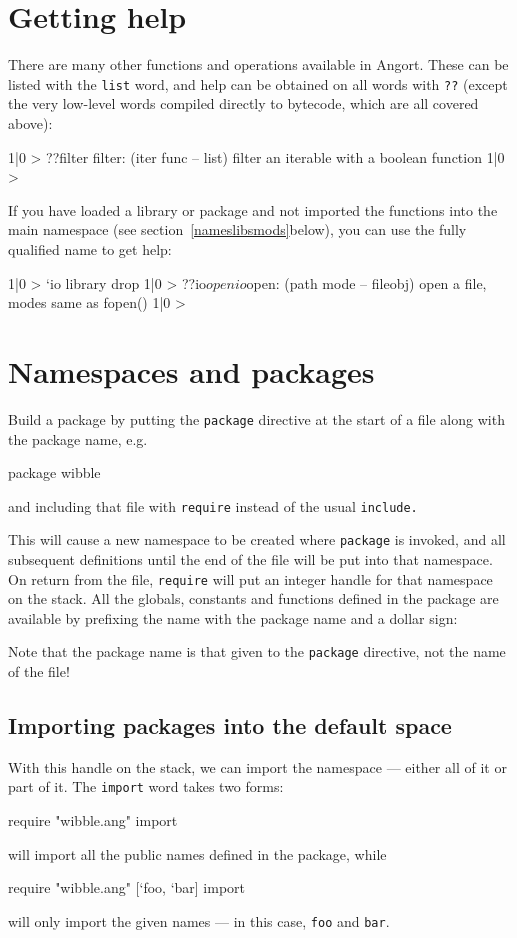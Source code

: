 \section{Getting help}
There are many other functions and operations available in Angort.
These can be listed with the \texttt{list} word, and help can
be obtained on all words with \texttt{??} (except the very low-level words compiled
directly to bytecode, which are all covered above):
\begin{v}
1|0 > ??filter
filter: (iter func -- list) filter an iterable with a boolean function
1|0 > 
\end{v}
If you have loaded a library or package and not imported the functions
into the main namespace (see section~\ref{nameslibsmods}below), you
can use the fully qualified name to get help:
\begin{v}
1|0 > `io library drop
1|0 > ??io$open
io$open: (path mode -- fileobj) open a file, modes same as fopen()
1|0 > 
\end{v}


\section{Namespaces and packages}
\label{packages}
\def\dollarsign{\$}\indw{\dollarsign}
Build a package by putting the \texttt{package} directive at the start
of a file along with the package name, e.g.
\begin{v}
package wibble
\end{v}
and including that file with \texttt{require} instead of the usual \texttt{include.} 

This will cause a new namespace to be created where \texttt{package} is 
invoked, and all subsequent definitions until the end of the file will
be put into that namespace. On return from the file, \texttt{require} will
put an integer handle for that namespace on the stack. All the globals,
constants and functions defined in the package are available by prefixing
the name with the package name and a dollar sign:
Note that the package name is that given to the \texttt{package} directive,
not the name of the file!

\subsection{Importing packages into the default space}
With this handle on the stack, we can import the namespace --- either
all of it or part of it. The \texttt{import} word takes two forms:
\begin{v}
require "wibble.ang" import
\end{v}
will import all the public names defined in the package, while
\begin{v}
require "wibble.ang" [`foo, `bar] import
\end{v}
will only import the given names --- in this case, \texttt{foo} and \texttt{bar}.

